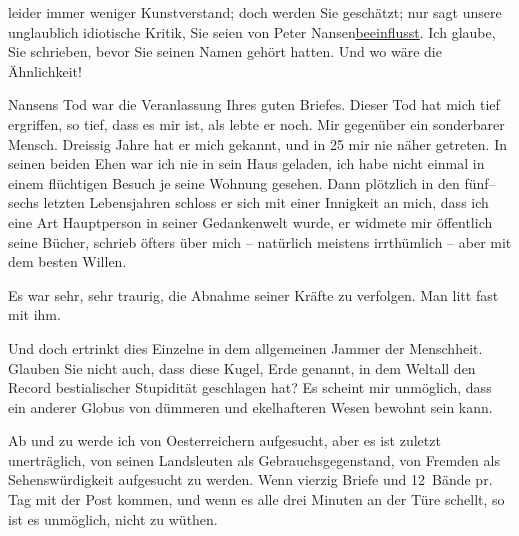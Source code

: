               leider immer weniger Kunstverstand; doch werden Sie geschätzt; nur sagt unsere
               unglaublich idiotische Kritik, Sie seien von Peter
                  Nansen\uline{beeinflusst}. Ich glaube, Sie schrieben, bevor Sie
               seinen Namen gehört hatten. Und wo wäre die Ähnlichkeit!\pend
           
\pstart
           Nansens Tod war die Veranlassung Ihres guten
               Briefes. Dieser Tod hat mich tief ergriffen, so tief, dass es mir ist, als lebte er
               noch. Mir gegenüber ein sonderbarer Mensch. Dreissig Jahre hat er mich gekannt, und
                  \introOben{}in 25\introOben{} mir nie näher getreten. In seinen beiden Ehen war
               ich nie in sein Haus geladen, ich habe nicht einmal in einem flüchtigen Besuch je
               seine Wohnung {\pb}gesehen. Dann
               plötzlich in den fünf–sechs letzten Lebensjahren schloss er sich mit einer Innigkeit
               an mich, dass ich eine Art Hauptperson in seiner Gedankenwelt wurde, er widmete mir
               öffentlich seine Bücher,
               schrieb öfters über mich – natürlich meistens irrthümlich – aber mit dem besten
               Willen.\pend
           
\pstart
           Es war sehr, sehr traurig, die Abnahme seiner Kräfte zu verfolgen. Man litt fast mit
               ihm.\pend
           
\pstart
           Und doch ertrinkt dies Einzelne in dem allgemeinen Jammer der Menschheit. Glauben Sie
               nicht  auch, dass diese Kugel, Erde genannt, in dem
               Weltall den Record bestialischer Stupidität geschlagen hat? Es scheint mir unmöglich,
               dass ein anderer Globus von dümmeren und ekelhafteren Wesen bewohnt sein kann.\pend
           
\pstart
           Ab und zu werde ich von Oesterreichern
               aufgesucht, aber es ist zuletzt unerträglich, von seinen Landsleuten als
               Gebrauchsgegenstand, {\pb}von Fremden
               als Sehenswürdigkeit aufgesucht zu werden. Wenn vierzig Briefe und 12 Bände pr. Tag
                   mit der Post \introOben{}kommen,\introOben{} und wenn es alle drei Minuten an der Türe schellt, so ist es
               unmöglich, nicht zu wüthen.\pend
           
